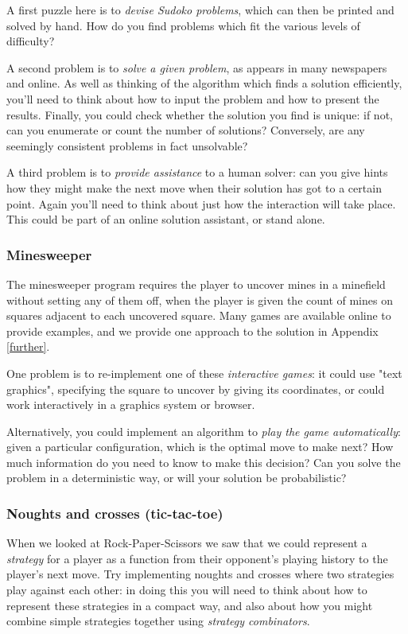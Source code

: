A first puzzle here is to \emph{devise Sudoko problems}, which can then be printed and solved by hand. How do you find problems which fit the various levels of difficulty?

A second problem is to \emph{solve a given problem}, as appears in many newspapers and online. As well as thinking of the algorithm which finds a solution efficiently, you'll need to think about how to input the problem and how to present the results. Finally, you could check whether the solution you find is unique: if not, can you enumerate or count the number of solutions? Conversely, are any seemingly consistent problems in fact unsolvable?

A third problem is to \emph{provide assistance} to a human solver: can you give hints how they might make the next move when their solution has got to a certain point. Again you'll need to think about just how the interaction will take place. This could be part of an online solution assistant, or stand alone.

\subsubsection*{Minesweeper}

The minesweeper program requires the player to uncover mines in a minefield without setting any of them off, when the player is given the count of mines on squares adjacent to each uncovered square. Many games are available online to provide examples, and we provide one approach to the solution in Appendix \ref{further}.

One problem is to re-implement one of these \emph{interactive games}: it could use "text graphics", specifying the square to uncover by giving its coordinates, or could work interactively in a graphics system or browser.

Alternatively, you could implement an algorithm to \emph{play the game automatically}: given a particular configuration, which is the optimal move to make next? How much information do you need to know to make this decision? Can you solve the problem in a deterministic way, or will your solution be probabilistic?

\subsubsection*{Noughts and crosses (tic-tac-toe)}


When we looked at Rock-Paper-Scissors we saw that we could represent a \emph{strategy} for a player as a function from their opponent's playing history to the player's next move. Try implementing noughts and crosses where two strategies play against each other: in doing this you will need to think about how to represent these strategies in a compact way, and also about how you might combine simple strategies together using \emph{strategy combinators}.


